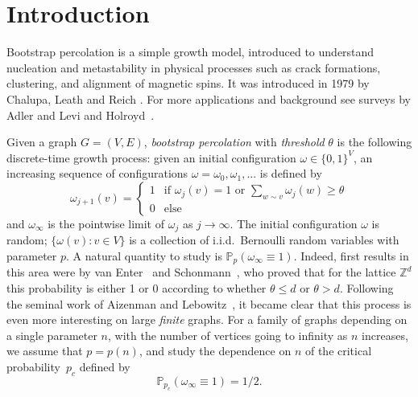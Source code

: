 \documentclass{amsart}
\newcommand{\prob}{\mathbb{P}}
\newcommand{\threshold}{\theta}
\numberwithin{equation}{section}
\theoremstyle{definition}
\theoremstyle{remark}
\begin{document}
\section{Introduction}

 \newcommand{\note}[1]{{\bf \textcolor{blue}
{[#1\marginpar{\textcolor{red}{***}}]}}}
\newcommand{\bfit}[1]
{\emph{\textbf{#1}}}

Bootstrap percolation is a simple growth model, introduced to understand nucleation and metastability in physical processes such as crack formations, clustering, and alignment of magnetic
spins. It was introduced in 1979 by Chalupa, Leath and Reich \cite{bethe}. For more applications and background see surveys by Adler and Levi \cite{brazil} and Holroyd~\cite{holroyd-survey}.

Given a graph $G=(V,E)$, {\it bootstrap percolation\/} with {\it threshold\/} $\threshold$
is the following discrete-time growth process: given an initial configuration $\omega \in
\{0,1\}^V$, an increasing sequence of configurations 
$\omega=\omega_0,\omega_1,\ldots$ is defined by
$$
\omega_{j+1}(v)=
\begin{cases}
1& \text{if $\omega_j(v)=1$ or $\sum_{w \sim  v}\omega_j(w) \geq
\threshold$}\\
0 &\text{else}
\end{cases}
$$
and $\omega_\infty$ is the pointwise limit of $\omega_j$ as $j\to\infty$.
The initial configuration $\omega$ is random; $\{\omega(v): v \in V\}$ is a collection of i.i.d.\ Bernoulli random variables with parameter $p$. A natural quantity to study is $\prob_{p}(\omega_\infty\equiv 1)$. Indeed, first results in this area were by van Enter~\cite{vanenter} and Schonmann~\cite{schonmann}, who proved that for the lattice $\mathbb{Z}^d$ this probability is either 1 or 0 according to whether $\threshold \le d$ or $\threshold > d$. Following the seminal work of Aizenman and Lebowitz~\cite{aizenman},
it became clear that this process is even more interesting on large {\em finite} graphs.  For a family of graphs depending on a single parameter $n$, with the number of vertices going to infinity as $n$ increases, we assume that $p=p(n)$, and study the dependence on $n$ of the critical probability~$p_c$ defined by
\begin{equation*}
\prob_{p_c}(\omega_\infty\equiv1)=1/2.
\end{equation*}
\end{document}
